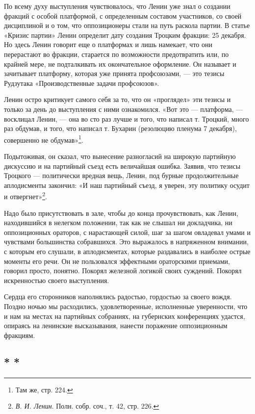 \documentclass[12pt, a4paper, openany]{book}
\begin{document}
По всему духу выступления чувствовалось, что Ленин уже знал о создании фракций с особой платформой, с определенным составом участников, со своей дисциплиной и о том, что оппозиционеры стали на путь раскола партии. В статье «Кризис партии» Ленин определит дату создания Троцким фракции: 25 декабря. Но здесь Ленин говорит еще о платформах и лишь намекает, что они перерастают во фракции, старается по возможности предотвратить или, по крайней мере, не подталкивать их окончательное оформление. Он называет и зачитывает платформу, которая уже принята профсоюзами, — это тезисы Рудзутака «Производственные задачи профсоюзов».

Ленин остро критикует самого себя за то, что он «проглядел» эти тезисы и только за день до выступления с ними ознакомился. «Вот это — платформа, — восклицал Ленин, — она во сто раз лучше и того, что написал т. Троцкий, много раз обдумав, и того, что написал т. Бухарин (резолюцию пленума 7 декабря), совершенно не обдумав»\footnote{Там же, стр. 224.}.

Подытоживая, он сказал, что вынесение разногласий на широкую партийную дискуссию и на партийный съезд есть величайшая ошибка. Заявив, что тезисы Троцкого — политически вредная вещь, Ленин, под бурные продолжительные аплодисменты закончил: «И наш партийный съезд, я уверен, эту политику осудит и отвергнет»\footnote{\textit{В. И. Ленин}. Полн. собр. соч., т. 42, стр. 226.}.

Надо было присутствовать в зале, чтобы до конца прочувствовать, как Ленин, находившийся в нелегком положении, так как не слышал ни докладчика, ни оппозиционных ораторов, с нарастающей силой, шаг за шагом овладевал умами и чувствами большинства собравшихся. Это выражалось в напряженном внимании, с которым его слушали, в аплодисментах, которые раздавались в наиболее острые моменты его речи. Он не пользовался эффектными ораторскими приемами, говорил просто, понятно. Покорял железной логикой своих суждений. Покорял искренностью своего выступления.

Сердца его сторонников наполнялись радостью, гордостью за своего вождя. Поздно ночью мы расходились, удовлетворенные, исполненные уверенности, что и нам на местах на партийных собраниях, на губернских конференциях удастся, опираясь на ленинские высказывания, нанести поражение оппозиционным фракциям.

\subsection*{\center * * *}
\end{document}
